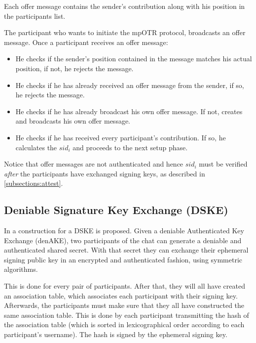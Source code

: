 Each offer message contains the sender's contribution along with his position in the participants list.

The participant who wants to initiate the mpOTR protocol, broadcasts an offer message. Once a participant receives an offer message:

\begin{itemize}
	\item[]He checks if the sender's position contained in the message matches his actual position, if not, he rejects the message.

	\item[]He checks if he has already received an offer message from the sender, if so, he rejects the message.

	\item[]He checks if he has already broadcast his own offer message. If not, creates and broadcasts his own offer message.

	\item[]He checks if he has received every participant's contribution. If so, he calculates the $sid_i$ and proceeds to the next setup phase.
\end{itemize}

Notice that offer messages are not authenticated and hence $sid_i$ must
be verified \emph{after} the participants have exchanged signing keys, as described in \ref{subsections:attest}.


\subsection{Deniable Signature Key Exchange (DSKE)}
\label{subsections:DSKE}
In \cite{mpotr} a construction for a DSKE is proposed. Given a deniable Authenticated Key Exchange (denAKE), two participants of the chat can generate a deniable and authenticated shared secret. With that secret they can exchange their ephemeral signing public key in an encrypted and authenticated fashion, using symmetric algorithms.

This is done for every pair of participants. After that, they will all have created an association table, which associates each participant with their signing key. Afterwards, the participants must make sure that they all have constructed the same association table. This is done by each participant
transmitting the hash of the association table (which is sorted in lexicographical order according to each participant's username). The hash is signed by the ephemeral signing key.

